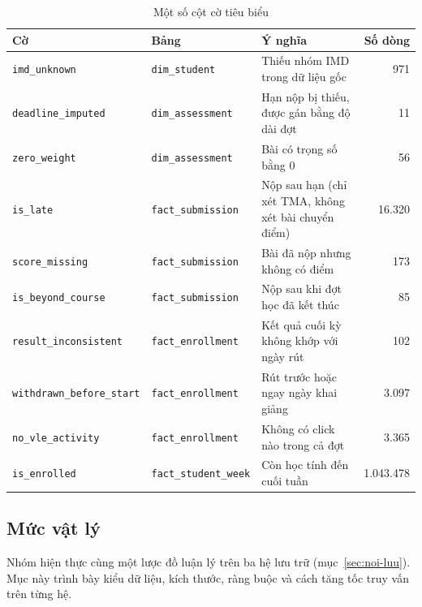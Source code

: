 \begin{table}[htbp]
\centering
\small
\begin{tabularx}{\textwidth}{|l|l|X|r|}
\hline
\textbf{Cờ} & \textbf{Bảng} & \textbf{Ý nghĩa} & \textbf{Số dòng} \\ \hline
\texttt{imd\_unknown} & \texttt{dim\_student} & Thiếu nhóm IMD trong dữ liệu gốc & 971 \\ \hline
\texttt{deadline\_imputed} & \texttt{dim\_assessment} & Hạn nộp bị thiếu, được gán bằng độ dài đợt & 11 \\ \hline
\texttt{zero\_weight} & \texttt{dim\_assessment} & Bài có trọng số bằng 0 & 56 \\ \hline
\texttt{is\_late} & \texttt{fact\_submission} & Nộp sau hạn (chỉ xét TMA, không xét bài chuyển điểm) & 16.320 \\ \hline
\texttt{score\_missing} & \texttt{fact\_submission} & Bài đã nộp nhưng không có điểm & 173 \\ \hline
\texttt{is\_beyond\_course} & \texttt{fact\_submission} & Nộp sau khi đợt học đã kết thúc & 85 \\ \hline
\texttt{result\_inconsistent} & \texttt{fact\_enrollment} & Kết quả cuối kỳ không khớp với ngày rút & 102 \\ \hline
\texttt{withdrawn\_before\_start} & \texttt{fact\_enrollment} & Rút trước hoặc ngay ngày khai giảng & 3.097 \\ \hline
\texttt{no\_vle\_activity} & \texttt{fact\_enrollment} & Không có click nào trong cả đợt & 3.365 \\ \hline
\texttt{is\_enrolled} & \texttt{fact\_student\_week} & Còn học tính đến cuối tuần & 1.043.478 \\ \hline
\end{tabularx}
\caption{Một số cột cờ tiêu biểu}
\label{tab:co}
\end{table}

\subsection{Mức vật lý}
\label{sec:vat-ly}

Nhóm hiện thực cùng một lược đồ luận lý trên ba hệ lưu trữ (mục~\ref{sec:noi-luu}). Mục này
trình bày kiểu dữ liệu, kích thước, ràng buộc và cách tăng tốc truy vấn trên từng hệ.

